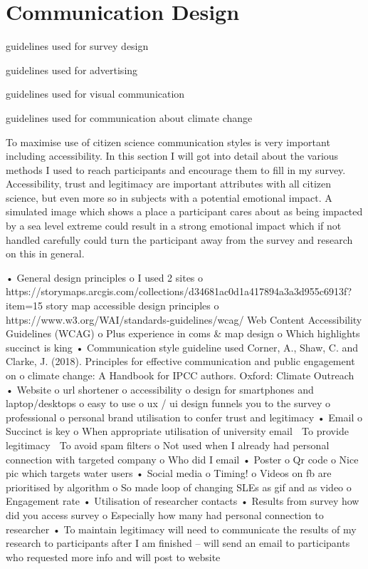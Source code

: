 \section{Communication Design}
guidelines used for survey design

guidelines used for advertising

guidelines used for visual communication

guidelines used for communication about climate change

To maximise use of citizen science communication styles is very important including accessibility. In this section I will got into detail about the various methods I used to reach participants and encourage them to fill in my survey. Accessibility, trust and legitimacy are important attributes with all citizen science, but even more so in subjects with a potential emotional impact. A simulated image which shows a place a participant cares about as being impacted by a sea level extreme could result in a strong emotional impact which if not handled carefully could turn the participant away from the survey and research on this in general.


•	General design principles
o	 I used 2 sites 
o	https://storymaps.arcgis.com/collections/d34681ac0d1a417894a3a3d955c6913f?item=15 story map accessible design principles 
o	https://www.w3.org/WAI/standards-guidelines/wcag/ Web Content Accessibility Guidelines (WCAG)
o	Plus experience in coms & map design
o	Which highlights succinct is king
•	Communication style guideline used
Corner, A., Shaw, C. and Clarke, J. (2018). Principles for effective communication and public engagement on
o	climate change: A Handbook for IPCC authors. Oxford: Climate Outreach 
•	Website 
o	url shortener
o	accessibility
o	design for smartphones and laptop/desktops
o	easy to use
o	ux / ui design funnels you to the survey
o	professional 
o	personal brand utilisation to confer trust and legitimacy
•	Email
o	 Succinct is key
o	When appropriate utilisation of university email
	To provide legitimacy
	To avoid spam filters
o	Not used when I already had personal connection with targeted company
o	Who did I email 
•	Poster
o	Qr code
o	Nice pic which targets water users
•	Social media
o	Timing!
o	Videos on fb are prioritised by algorithm
o	So made loop of changing SLEs as gif and as video
o	Engagement rate
•	Utilisation of researcher contacts
•	Results from survey how did you access survey
o	Especially how many had personal connection to researcher
•	To maintain legitimacy will need to communicate the results of my research to participants after I am finished – will send an email to participants who requested more info and will post to website 


